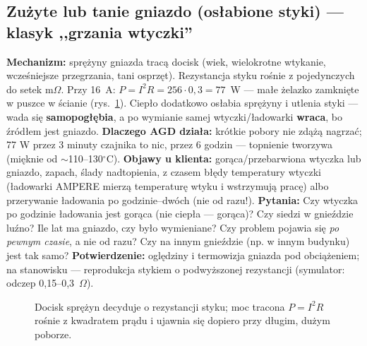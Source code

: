 \documentclass[11pt,a4paper]{article}
\newcommand{\ohm}{$\Omega$}
\newcommand{\stC}{$^\circ$C}
\begin{document}
\subsection{Zużyte lub tanie gniazdo (osłabione styki) --- klasyk ,,grzania wtyczki''}
\textbf{Mechanizm:} sprężyny gniazda tracą docisk (wiek, wielokrotne wtykanie, wcześniejsze
przegrzania, tani osprzęt). Rezystancja styku rośnie z pojedynczych do setek m\ohm. Przy 16~A:
$P=I^2R=256\cdot0{,}3=77$~W --- małe żelazko zamknięte w puszce w ścianie (rys.~\ref{fig:schuko}).
Ciepło dodatkowo osłabia sprężyny i utlenia styki --- wada się \textbf{samopogłębia}, a po wymianie
samej wtyczki/ładowarki \textbf{wraca}, bo źródłem jest gniazdo.
\textbf{Dlaczego AGD działa:} krótkie pobory nie zdążą nagrzać; 77 W przez 3 minuty czajnika to nic,
przez 6 godzin --- topnienie tworzywa (mięknie od $\sim$110--130\stC).
\textbf{Objawy u klienta:} gorąca/przebarwiona wtyczka lub gniazdo, zapach, ślady nadtopienia,
z czasem błędy temperatury wtyczki (ładowarki AMPERE mierzą temperaturę wtyku i wstrzymują pracę)
albo przerywanie ładowania po godzinie--dwóch (nie od razu!).
\textbf{Pytania:} Czy wtyczka po godzinie ładowania jest gorąca (nie ciepła --- gorąca)? Czy siedzi
w gnieździe luźno? Ile lat ma gniazdo, czy było wymieniane? Czy problem pojawia się \emph{po pewnym
czasie}, a nie od razu? Czy na innym gnieździe (np. w innym budynku) jest tak samo?
\textbf{Potwierdzenie:} oględziny i termowizja gniazda pod obciążeniem; na stanowisku ---
reprodukcja stykiem o podwyższonej rezystancji (symulator: odczep 0,15--0,3~\ohm).

\begin{figure}[h]
\centering
{}
\caption{Docisk sprężyn decyduje o rezystancji styku; moc tracona $P=I^2R$ rośnie z kwadratem
prądu i ujawnia się dopiero przy długim, dużym poborze.}
\label{fig:schuko}
\end{figure}
\end{document}

